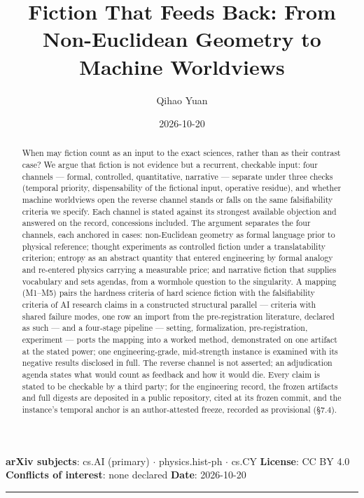 \documentclass[11pt,a4paper]{article}
\title{Fiction That Feeds Back: From Non-Euclidean Geometry to Machine Worldviews}
\author{Qihao Yuan}
\date{2026-10-20}
\begin{document}
\maketitle
\thispagestyle{empty}
\vspace{0.5em}
\noindent\textbf{arXiv subjects}: cs.AI (primary) $\cdot$ physics.hist-ph $\cdot$ cs.CY \quad \textbf{License}: CC BY 4.0 \quad \textbf{Conflicts of interest}: none declared \quad \textbf{Date}: 2026-10-20
\vspace{0.5em}
\hrule
\vspace{0.8em}

\begin{abstract}


When may fiction count as an input to the exact sciences, rather than as their contrast case? We argue that fiction is not evidence but a recurrent, checkable input: four channels — formal, controlled, quantitative, narrative — separate under three checks (temporal priority, dispensability of the fictional input, operative residue), and whether machine worldviews open the reverse channel stands or falls on the same falsifiability criteria we specify. Each channel is stated against its strongest available objection and answered on the record, concessions included. The argument separates the four channels, each anchored in cases: non-Euclidean geometry as formal language prior to physical reference; thought experiments as controlled fiction under a translatability criterion; entropy as an abstract quantity that entered engineering by formal analogy and re-entered physics carrying a measurable price; and narrative fiction that supplies vocabulary and sets agendas, from a wormhole question to the singularity. A mapping (M1–M5) pairs the hardness criteria of hard science fiction with the falsifiability criteria of AI research claims in a constructed structural parallel — criteria with shared failure modes, one row an import from the pre-registration literature, declared as such — and a four-stage pipeline — setting, formalization, pre-registration, experiment — ports the mapping into a worked method, demonstrated on one artifact at the stated power; one engineering-grade, mid-strength instance is examined with its negative results disclosed in full. The reverse channel is not asserted; an adjudication agenda states what would count as feedback and how it would die. Every claim is stated to be checkable by a third party; for the engineering record, the frozen artifacts and full digests are deposited in a public repository, cited at its frozen commit, and the instance's temporal anchor is an author-attested freeze, recorded as provisional (§7.4).

\end{abstract}
\end{document}
